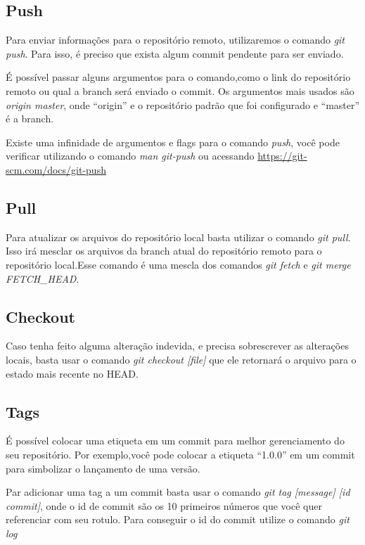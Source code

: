 \documentclass[]{article}
\begin{document}
\subsection*{Push}
Para enviar informações para o repositório remoto, utilizaremos o comando \textit{git push}. 
Para isso, é preciso que exista algum commit pendente para ser enviado.

É possível passar alguns argumentos para o comando,como o link do repositório remoto ou qual a branch será enviado o commit.
Os argumentos mais usados são \textit{origin master}, onde ``origin'' e o repositório padrão que foi configurado e ``master'' é a branch.

Existe uma infinidade de argumentos e flags para o comando \textit{push}, 
você pode verificar utilizando o comando \textit{man git-push} ou acessando \url{https://git-scm.com/docs/git-push}

\subsection*{Pull}

Para atualizar os arquivos do repositório local basta utilizar o comando \textit{git pull}. 
Isso irá mesclar os arquivos da branch atual do repositório remoto para o repositório local.Esse comando é uma mescla dos comandos 
\textit{git fetch} e \textit{git merge FETCH\_HEAD}.

\subsection*{Checkout}

Caso tenha feito alguma alteração indevida, e precisa sobrescrever as alterações locais,
 basta usar o comando \textit{git checkout [file]} que ele retornará o arquivo para o estado mais recente no HEAD.
 \subsection*{Tags}

 É possível colocar uma etiqueta em um commit para melhor gerenciamento do seu repositório.
 Por exemplo,você pode colocar a etiqueta ``1.0.0'' em um commit para simbolizar o lançamento de uma versão.

 Par adicionar uma tag a um commit basta usar o comando \textit{git tag [message] [id commit]},
  onde o id de commit são os 10 primeiros números que você quer referenciar com seu rotulo.
  Para conseguir o id do commit utilize o comando \textit{git log}
\end{document}
